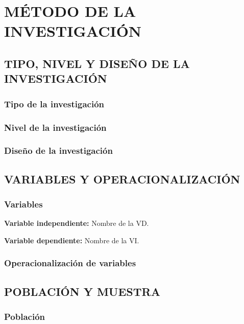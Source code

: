 \chapter{MÉTODO DE LA INVESTIGACIÓN}
\section{TIPO, NIVEL Y DISEÑO DE LA INVESTIGACIÓN}
\subsection{Tipo de la investigación}

\lipsum[1]

\subsection{Nivel de la investigación}

\lipsum[2]

\subsection{Diseño de la investigación}

\lipsum[3]

\section{VARIABLES Y OPERACIONALIZACIÓN}
\subsection{Variables}
\textbf{Variable independiente:}
Nombre de la VD.

\textbf{Variable dependiente:}
Nombre de la VI.

\subsection{Operacionalización de variables}

\lipsum[2]

\section{POBLACIÓN Y MUESTRA}

\subsection{Población}

